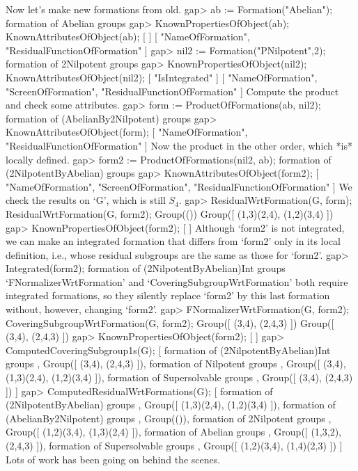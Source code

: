 Now let's make new formations from old.
\beginexample
gap> ab := Formation("Abelian");
formation of Abelian groups 
gap> KnownPropertiesOfObject(ab); KnownAttributesOfObject(ab);
[  ]
[ "NameOfFormation", "ResidualFunctionOfFormation" ]
gap> nil2 := Formation("PNilpotent",2);
formation of 2Nilpotent groups 
gap> KnownPropertiesOfObject(nil2); KnownAttributesOfObject(nil2);
[ "IsIntegrated" ]
[ "NameOfFormation", "ScreenOfFormation", "ResidualFunctionOfFormation" ]
\endexample
Compute the product and check some attributes.
\beginexample
gap> form := ProductOfFormations(ab, nil2);
formation of (AbelianBy2Nilpotent) groups 
gap> KnownAttributesOfObject(form);
[ "NameOfFormation", "ResidualFunctionOfFormation" ]
\endexample
Now the product in the other order, which *is* locally defined.
\beginexample
gap> form2 := ProductOfFormations(nil2, ab);
formation of (2NilpotentByAbelian) groups 
gap> KnownAttributesOfObject(form2);
[ "NameOfFormation", "ScreenOfFormation", "ResidualFunctionOfFormation" ]
\endexample
We check the results on `G', which is still $S_4$.
\beginexample
gap> ResidualWrtFormation(G, form);  ResidualWrtFormation(G, form2);
Group(())
Group([ (1,3)(2,4), (1,2)(3,4) ])
gap> KnownPropertiesOfObject(form2);
[  ]
\endexample
Although `form2' is not integrated, we can make an integrated formation
that differs from `form2' only in its local definition, i.e., whose
residual subgroups are the same as those for `form2'.
\beginexample
gap> Integrated(form2);
formation of (2NilpotentByAbelian)Int groups 
\endexample
`FNormalizerWrtFormation' and
`CoveringSubgroupWrtFormation' both require integrated formations, so they
silently replace `form2' by this last formation without, however,
changing `form2'. 
\beginexample
gap> FNormalizerWrtFormation(G, form2); CoveringSubgroupWrtFormation(G, form2);
Group([ (3,4), (2,4,3) ])
Group([ (3,4), (2,4,3) ])
gap> KnownPropertiesOfObject(form2);
[  ]
gap> ComputedCoveringSubgroup1s(G);
[ formation of (2NilpotentByAbelian)Int groups , Group([ (3,4), (2,4,3) ]), 
  formation of Nilpotent groups , Group([ (3,4), (1,3)(2,4), (1,2)(3,4) ]), 
  formation of Supersolvable groups , Group([ (3,4), (2,4,3) ]) ]
gap> ComputedResidualWrtFormations(G);
[ formation of (2NilpotentByAbelian) groups , 
  Group([ (1,3)(2,4), (1,2)(3,4) ]), 
  formation of (AbelianBy2Nilpotent) groups , Group(()), 
  formation of 2Nilpotent groups , Group([ (1,2)(3,4), (1,3)(2,4) ]), 
  formation of Abelian groups , Group([ (1,3,2), (2,4,3) ]), 
  formation of Supersolvable groups , Group([ (1,2)(3,4), (1,4)(2,3) ]) ]
\endexample
Lots of work has been going on behind the scenes.


